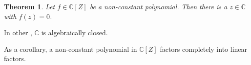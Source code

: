 \documentclass[12pt]{article}
\begin{document}
\newtheorem*{thm}{Theorem}
\begin{thm}
Let $f \in \mathbb{C}[Z]$ be a non-constant polynomial.  Then there is a $z\in\mathbb{C}$ with $f(z)=0$.
\end{thm}

In other , $\mathbb{C}$ is algebraically closed.

As a corollary, a non-constant polynomial in $\mathbb{C}[Z]$ factors completely
into linear factors. 
\end{document}

